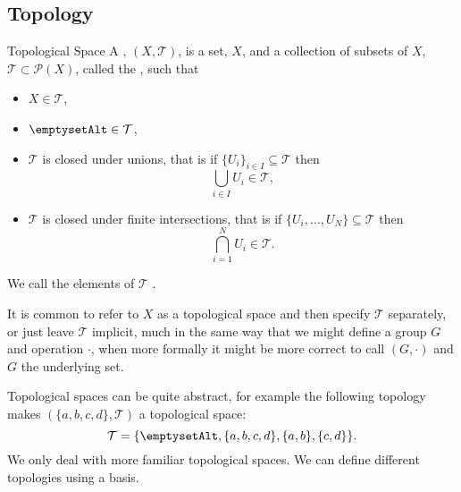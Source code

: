 \subsection{Topology}
\begin{dfn}{Topological Space}{}
    A , \((X, \mathcal{T})\), is a set, \(X\), and a collection of subsets of \(X\), \(\mathcal{T} \subset \mathcal{P}(X)\), called the , such that
    \begin{itemize}
        \item \(X \in \mathcal{T}\),
        \item \(\emptysetAlt \in \mathcal{T}\),
        \item \(\mathcal{T}\) is closed under unions, that is if \(\{U_i\}_{i \in I} \subseteq \mathcal{T}\) then\vspace{-1ex}
        \begin{equation}
            \bigcup_{i\in I} U_i \in \mathcal{T},
        \end{equation}\vspace{-4ex}
        \item \(\mathcal{T}\) is closed under finite intersections, that is if \(\{U_i, \dotsc, U_N\} \subseteq \mathcal{T}\) then\vspace{-4ex}
        \begin{equation}
            \bigcap_{i = 1}^{N} U_i \in \mathcal{T}.
        \end{equation}
    \end{itemize}\vspace{-1ex}
    We call the elements of \(\mathcal{T}\) .
\end{dfn}

It is common to refer to \(X\) as a topological space and then specify \(\mathcal{T}\) separately, or just leave \(\mathcal{T}\) implicit, much in the same way that we might define a group \(G\) and operation \(\cdot\), when more formally it might be more correct to call \((G, \cdot)\) and \(G\) the underlying set.

Topological spaces can be quite abstract, for example the following topology makes \((\{a, b, c, d\}, \mathcal{T})\) a topological space:
\begin{equation}
    \mathcal{T} = \{\emptysetAlt, \{a, b, c, d\}, \{a, b\}, \{c, d\}\}.
\end{equation}
We only deal with more familiar topological spaces.
We can define different topologies using a basis.


